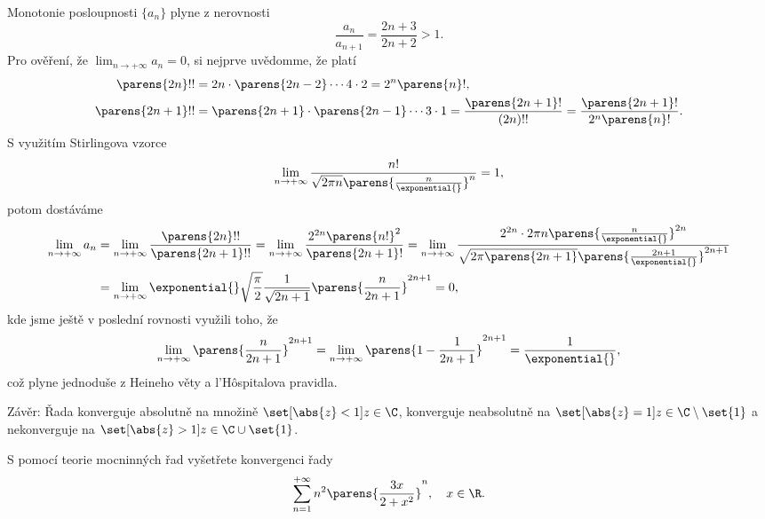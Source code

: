 \documentclass[answers]{exam}
\begin{document}
\begin{questions}
\begin{solution}
  	Monotonie posloupnosti $\{ a_n \}$ plyne z nerovnosti
  	\begin{equation*}
  		\frac{a_n}{a_{n+1}} = \frac{2n + 3}{2n + 2} > 1.
  	\end{equation*}  	
  	Pro ověření, že $\lim_{n \to+ \infty} a_n = 0$, si nejprve uvědomme, že platí
	  \begin{align*}
	  	\parens{2n}!! &= 2n \cdot \parens{2n-2} \cdots 4\cdot 2 = 2^n \parens{n}!,
	  	\\
	  	\parens{2n+1}!! &= \parens{2n+1} \cdot \parens{2n-1} \cdots 3 \cdot 1 = \frac{\parens{2n + 1}!}{(2n)!!} = \frac{\parens{2n +1}!}{2^n \parens{n}!}.
	  \end{align*}
	  S využitím Stirlingova vzorce
	  \begin{equation*}
	  	\lim_{n\to+\infty} \frac{n!}{\sqrt{2 \pi n} \parens{\frac{n}{\exponential{}}}^n} = 1,
	  \end{equation*}
	  potom dostáváme
	  \begin{align*}
	  	\lim_{n \to+ \infty} a_n
	  	&=
	  	\lim_{n \to+ \infty}
	  	\frac{\parens{2n}!!}{\parens{2n + 1}!!}
	  	=
	  	\lim_{n \to+ \infty}
	  	\frac{2^{2n} \parens{n!}^2}{\parens{2n + 1}!}
	  	=
	  	\lim_{n \to +\infty}
	  	\frac{2^{2n} \cdot 2 \pi n \parens{\frac{n}{\exponential{}}}^{2n}}{\sqrt{2 \pi \parens{2n + 1}} \parens{\frac{2n + 1}{\exponential{}}}^{2n + 1}}
	  	\\
	  	&=
	  	\lim_{n \to +\infty}
	  	\exponential{} \sqrt{\frac{\pi}{2}} \frac{1}{\sqrt{2n + 1}} \parens{\frac{n}{2n + 1}}^{2n + 1}
	  	=
	  	0,
	  \end{align*}
	  kde jsme ještě v poslední rovnosti využili toho, že
	  \begin{equation*}
	  	\lim_{n \to +\infty}
	  	\parens{\frac{n}{2n + 1}}^{2n + 1}
	  	=
	  	\lim_{n \to +\infty}
	  	\parens{1 - \frac{1}{2n + 1}}^{2n + 1}
	  	=
	  	\frac{1}{\exponential{}},
	  \end{equation*}
	  což plyne jednoduše z Heineho věty a l'H\^{o}spitalova pravidla.
	  
	  Závěr: Řada konverguje absolutně na množině $\set[\abs{z} < 1]{z \in \C}$, konverguje neabsolutně na $\set[\abs{z} = 1]{z \in \C} \setminus \set{1}$ a nekonverguje na $\set[\abs{z} > 1]{z \in \C} \cup \set{1}$.
  \end{solution}

  \question
  S pomocí teorie mocninných řad vyšetřete konvergenci řady
  \begin{equation*}
    \sum_{n = 1}^{+\infty}
		n^2 \parens{\frac{3x}{2 + x^2}}^n,
		\quad
		x \in \R.
  \end{equation*}
  

\end{questions}
\end{document}
